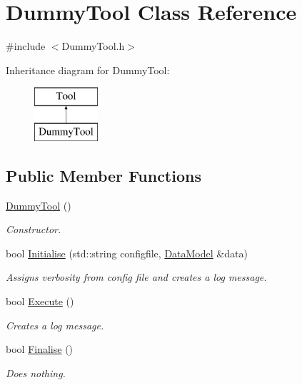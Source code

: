 \hypertarget{classDummyTool}{\section{Dummy\-Tool Class Reference}
\label{classDummyTool}
}


{\ttfamily \#include $<$Dummy\-Tool.\-h$>$}

Inheritance diagram for Dummy\-Tool\-:\begin{figure}[H]
\begin{center}
\leavevmode
\includegraphics[height=2.000000cm]{classDummyTool}
\end{center}
\end{figure}
\subsection*{Public Member Functions}
\begin{DoxyCompactItemize}
\item 
\hypertarget{classDummyTool_a33914471b4de346168aa92b5febb6f9c}{\hyperlink{classDummyTool_a33914471b4de346168aa92b5febb6f9c}{Dummy\-Tool} ()}\label{classDummyTool_a33914471b4de346168aa92b5febb6f9c}

\begin{DoxyCompactList}\small\item\em Constructor. \end{DoxyCompactList}\item 
\hypertarget{classDummyTool_a0d9cd781681a06ee3cf0cd1e7bb770a8}{bool \hyperlink{classDummyTool_a0d9cd781681a06ee3cf0cd1e7bb770a8}{Initialise} (std\-::string configfile, \hyperlink{classDataModel}{Data\-Model} \&data)}\label{classDummyTool_a0d9cd781681a06ee3cf0cd1e7bb770a8}

\begin{DoxyCompactList}\small\item\em Assigns verbosity from config file and creates a log message. \end{DoxyCompactList}\item 
\hypertarget{classDummyTool_ac107b31f1785c1cc803e0e65be548047}{bool \hyperlink{classDummyTool_ac107b31f1785c1cc803e0e65be548047}{Execute} ()}\label{classDummyTool_ac107b31f1785c1cc803e0e65be548047}

\begin{DoxyCompactList}\small\item\em Creates a log message. \end{DoxyCompactList}\item 
\hypertarget{classDummyTool_aacb5d0b9906a27c2b4bba4aae9bc093a}{bool \hyperlink{classDummyTool_aacb5d0b9906a27c2b4bba4aae9bc093a}{Finalise} ()}\label{classDummyTool_aacb5d0b9906a27c2b4bba4aae9bc093a}

\begin{DoxyCompactList}\small\item\em Does nothing. \end{DoxyCompactList}\end{DoxyCompactItemize}
